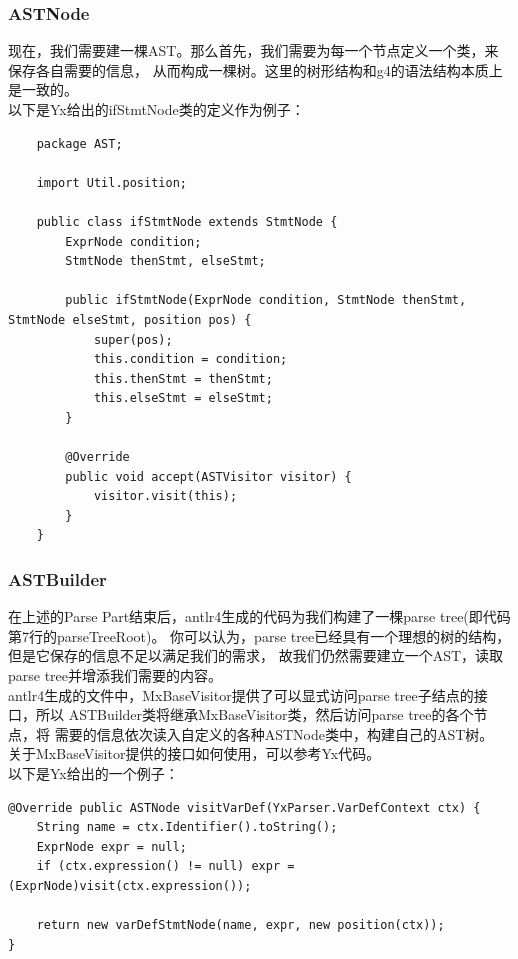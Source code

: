 \subsubsection{ASTNode}
现在，我们需要建一棵AST。那么首先，我们需要为每一个节点定义一个类，来保存各自需要的信息，
从而构成一棵树。这里的树形结构和g4的语法结构本质上是一致的。\\
以下是Yx给出的ifStmtNode类的定义作为例子：
\begin{lstlisting}
    package AST;

    import Util.position;
    
    public class ifStmtNode extends StmtNode {
        ExprNode condition;
        StmtNode thenStmt, elseStmt;
    
        public ifStmtNode(ExprNode condition, StmtNode thenStmt, StmtNode elseStmt, position pos) {
            super(pos);
            this.condition = condition;
            this.thenStmt = thenStmt;
            this.elseStmt = elseStmt;
        }
    
        @Override
        public void accept(ASTVisitor visitor) {
            visitor.visit(this);
        }
    }
\end{lstlisting}


\subsubsection{ASTBuilder}
在上述的Parse Part结束后，antlr4生成的代码为我们构建了一棵parse tree(即代码第7行的parseTreeRoot)。
你可以认为，parse tree已经具有一个理想的树的结构，但是它保存的信息不足以满足我们的需求，
故我们仍然需要建立一个AST，读取parse tree并增添我们需要的内容。\\

antlr4生成的文件中，MxBaseVisitor提供了可以显式访问parse tree子结点的接口，所以
ASTBuilder类将继承MxBaseVisitor类，然后访问parse tree的各个节点，将
需要的信息依次读入自定义的各种ASTNode类中，构建自己的AST树。\\

关于MxBaseVisitor提供的接口如何使用，可以参考Yx代码。 \\

以下是Yx给出的一个例子：
\begin{lstlisting}
@Override public ASTNode visitVarDef(YxParser.VarDefContext ctx) {
    String name = ctx.Identifier().toString();
    ExprNode expr = null;
    if (ctx.expression() != null) expr = (ExprNode)visit(ctx.expression());

    return new varDefStmtNode(name, expr, new position(ctx));
}
\end{lstlisting}


